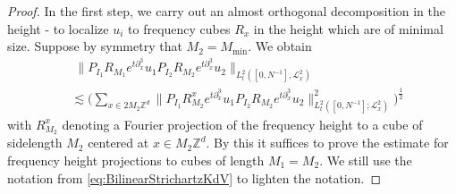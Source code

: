 \documentclass{amsart}
\theoremstyle{definition}
\newcommand{\Z}{\mathbb{Z}}
\begin{document}
\begin{proof}
In the first step, we carry out an almost orthogonal decomposition in the height - to localize $u_i$ to frequency cubes $R_x$ in the height which are of minimal size.
Suppose by symmetry that $M_2 = M_{\min}$. We obtain
\begin{equation}
\label{eq:AlmostOrthogonalAiry}
\begin{split}
&\; \| P_{I_1} R_{M_1} e^{t \partial_x^3} u_1 P_{I_2} R_{M_2} e^{t \partial_x^3} u_2 \|_{L_t^2([0,N^{-1}],\mathcal{L}^2_x)} \\
&\lesssim \big( \sum_{x \in 2M_2 \Z^d} \| P_{I_1} R^x_{M_2} e^{t \partial_x^3} u_1 P_{I_2} R_{M_2} e^{t \partial_x^3} u_2 \|^2_{L_t^2([0,N^{-1}];\mathcal{L}^2_x)} \big)^{\frac{1}{2}}
\end{split}
\end{equation}
with $R_{M_2}^x$ denoting a Fourier projection of the frequency height to a cube of sidelength $M_2$ centered at $x \in M_2 \Z^d$.
By this it suffices to prove the estimate for frequency height projections to cubes of length $M_1 = M_2$. We still use the notation from \eqref{eq:BilinearStrichartzKdV} to lighten the notation.


\end{proof}
\end{document}

